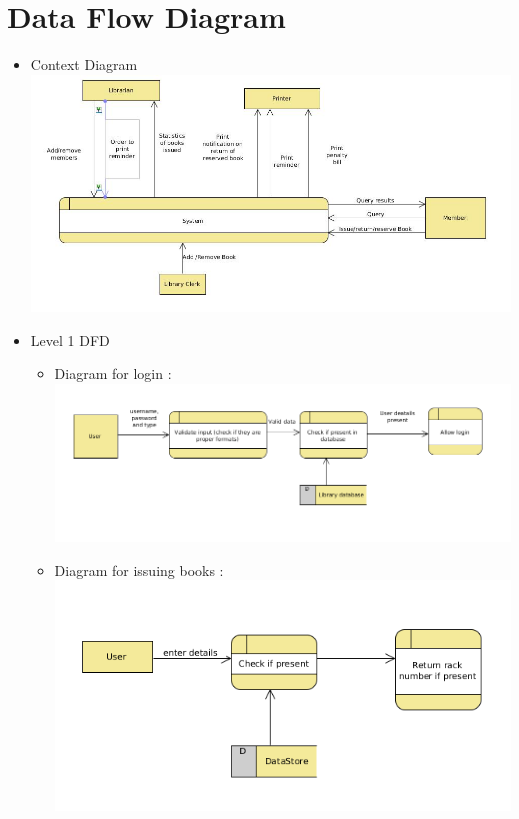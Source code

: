 \documentclass{article}
\begin{document}
\section{Data Flow Diagram}

\begin{itemize}
\item Context Diagram\\
\includegraphics[scale=0.5]{images/contextDiag.jpg}
\item Level 1 DFD\\
\begin{itemize}
\item Diagram for login : \\
\includegraphics[scale=0.5]{images/dfdDiagLogin.png}\\
\item Diagram for issuing books : \\ \includegraphics[scale=0.5]{images/DFDDiagIssue.png}\\

\end{itemize}
\end{itemize}
\end{document}
